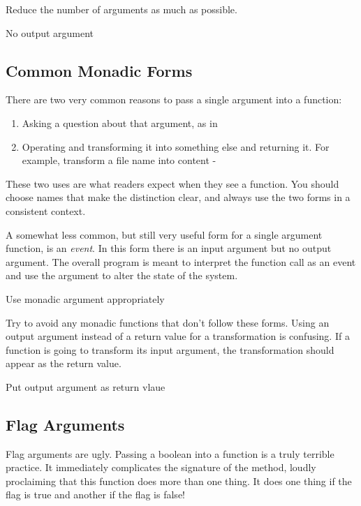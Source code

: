 \begin{marker}
Reduce the number of arguments as much as possible.

No output argument
\end{marker}

\subsection{Common Monadic Forms}

There are two very common reasons to pass a single argument into a function:

\begin{enumerate}
    \item Asking a question about that argument, as in 
    \item Operating and transforming it into something else and returning it. For example, transform a file name into content - 
\end{enumerate}

These two uses are what readers expect when they see a function. You should choose names that make the distinction clear, and always use the two forms in a consistent context.

A somewhat less common, but still very useful form for a single argument function, is an \textit{event}. In this form there is an input argument but no output argument. The overall program is meant to interpret the function call as an event and use the argument to alter the state of the system.

\begin{marker}
Use monadic argument appropriately
\end{marker}

Try to avoid any monadic functions that don’t follow these forms. Using an output argument instead of a return value for a transformation is confusing. If a function is going to transform its input argument, the transformation should appear as the return value.

\begin{marker}
Put output argument as return vlaue
\end{marker}

\subsection{Flag Arguments}

Flag arguments are ugly. Passing a boolean into a function is a truly terrible practice. It immediately complicates the signature of the method, loudly proclaiming that this function does more than one thing. It does one thing if the flag is true and another if the flag is false!

